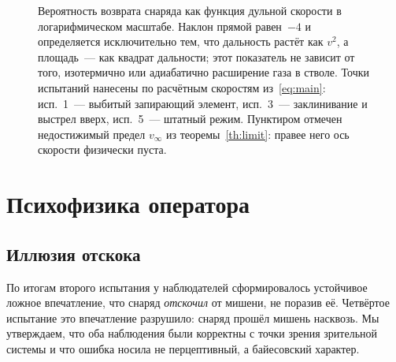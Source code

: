 \documentclass[11pt,a4paper]{article}
\begin{document}
\begin{figure}[h!]
\centering
{}
\caption{Вероятность возврата снаряда как функция дульной скорости в логарифмическом масштабе. Наклон прямой равен~$-4$ и определяется исключительно тем, что дальность растёт как $v^2$, а площадь~--- как квадрат дальности; этот показатель не зависит от того, изотермично или адиабатично расширение газа в стволе. Точки испытаний нанесены по расчётным скоростям из~\eqref{eq:main}: исп.~1~--- выбитый запирающий элемент, исп.~3~--- заклинивание и выстрел вверх, исп.~5~--- штатный режим. Пунктиром отмечен недостижимый предел $v_\infty$ из теоремы~\ref{th:limit}: правее него ось скорости физически пуста.}
\label{fig:lost}
\end{figure}

\section{Психофизика оператора}

\subsection{Иллюзия отскока}

По итогам второго испытания у наблюдателей сформировалось устойчивое ложное впечатление, что снаряд \emph{отскочил} от мишени, не поразив её. Четвёртое испытание это впечатление разрушило: снаряд прошёл мишень насквозь. Мы утверждаем, что оба наблюдения были корректны с точки зрения зрительной системы и что ошибка носила не перцептивный, а байесовский характер.
\end{document}
